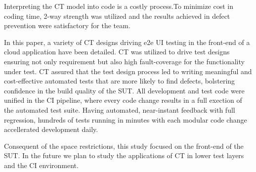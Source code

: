 \documentclass[conference]{IEEEtran}
\begin{document}
Interpreting the CT model into code is a costly process.To minimize cost in coding time, 2-way strength was utilized and the results achieved in defect prevention were satisfactory for the team. 

In this paper, a variety of CT designs driving e2e UI testing in the front-end of a cloud application have been detailed.
CT was utilized to drive test designs ensuring not only requirement but also high fault-coverage for the functionality under test.
CT assured that the test design process led to writing meaningful and cost-effective automated tests that are more likely to find defects, bolstering confidence in the build quality of the SUT.
All development and test code were unified in the CI pipeline, where every code change results in a full exection of the automated test suite.
Having automated, near-instant feedback with full regression, hundreds of tests running in minutes with each modular code change accellerated development daily.

Consequent of the space restrictions, this study focused on the front-end of the SUT. In the future we plan to study the applications of CT in lower test layers and the CI environment. 



\end{document}
